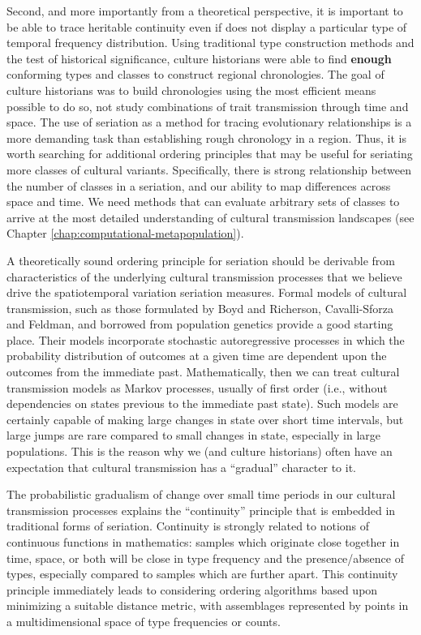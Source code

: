 Second, and more importantly from a theoretical perspective, it is
important to be able to trace heritable continuity even if does not
display a particular type of temporal frequency distribution. Using
traditional type construction methods and the test of historical
significance, culture historians were able to find \textbf{enough}
conforming types and classes to construct regional chronologies. The
goal of culture historians was to build chronologies using the most
efficient means possible to do so, not study combinations of trait
transmission through time and space. The use of seriation as a method
for tracing evolutionary relationships is a more demanding task than
establishing rough chronology in a region. Thus, it is worth searching
for additional ordering principles that may be useful for seriating more
classes of cultural variants. Specifically, there is strong relationship
between the number of classes in a seriation, and our ability to map
differences across space and time. We need methods that can evaluate
arbitrary sets of classes to arrive at the most detailed understanding
of cultural transmission landscapes (see Chapter \ref{chap:computational-metapopulation}).

A theoretically sound ordering principle for seriation should be
derivable from characteristics of the underlying cultural transmission
processes that we believe drive the spatiotemporal variation seriation
measures. Formal models of cultural transmission, such as those
formulated by Boyd and Richerson, Cavalli-Sforza and Feldman, and
borrowed from population genetics
\citep{Boyd1985, Cavalli-Sforza1981, Neiman1995} provide a good starting
place. Their models incorporate stochastic autoregressive processes in
which the probability distribution of outcomes at a given time are
dependent upon the outcomes from the immediate past. Mathematically,
then we can treat cultural transmission models as Markov processes,
usually of first order (i.e., without dependencies on states previous to
the immediate past state). Such models are certainly capable of making
large changes in state over short time intervals, but large jumps are
rare compared to small changes in state, especially in large
populations. This is the reason why we (and culture historians) often
have an expectation that cultural transmission has a ``gradual''
character to it.

The probabilistic gradualism of change over small time periods in our
cultural transmission processes explains the ``continuity'' principle
that is embedded in traditional forms of seriation. Continuity is
strongly related to notions of continuous functions in mathematics:
samples which originate close together in time, space, or both will be
close in type frequency and the presence/absence of types, especially
compared to samples which are further apart. This continuity principle
immediately leads to considering ordering algorithms based upon
minimizing a suitable distance metric, with assemblages represented by
points in a multidimensional space of type frequencies or counts.

